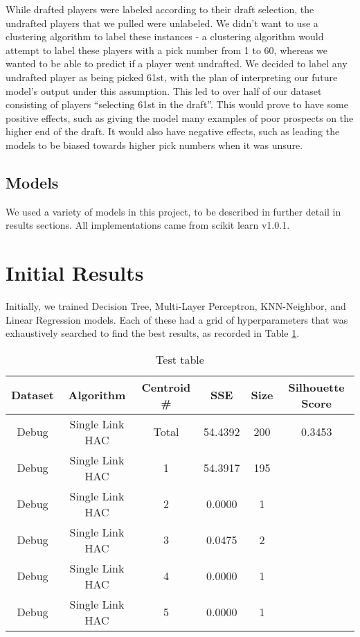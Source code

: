 \documentclass{article}
\begin{document}
While drafted players were labeled according to their draft selection, the
undrafted players that we pulled were unlabeled. We didn’t want to use a
clustering algorithm to label these instances - a clustering algorithm would
attempt to label these players with a pick number from 1 to 60, whereas we
wanted to be able to predict if a player went undrafted. We decided to label any
undrafted player as being picked 61st, with the plan of interpreting our future
model’s output under this assumption. This led to over half of our dataset
consisting of players “selecting 61st in the draft”. This would prove to have
some positive effects, such as giving the model many examples of poor prospects
on the higher end of the draft. It would also have negative effects, such as
leading the models to be biased towards higher pick numbers when it was unsure. 

\subsection{Models}

We used a variety of models in this project, to be described in further detail
in results sections. All implementations came from scikit learn v1.0.1.

\section{Initial Results}

Initially, we trained Decision Tree, Multi-Layer Perceptron, KNN-Neighbor, and
Linear Regression models. Each of these had a grid of hyperparameters that was
exhaustively searched to find the best results, as recorded in Table
\ref{tab:test_table}.

\begin{table}
	\begin{center}
		\begin{tabular}{||c c c c c c||} 
		\hline\hline
		Dataset & Algorithm & Centroid \# & SSE & Size & Silhouette Score \\ 
		\hline\hline
		Debug & Single Link HAC & Total & 54.4392 & 200 & 0.3453 \\ \hline
		Debug & Single Link HAC & 1 & 54.3917 & 195 & \\ \hline
		Debug & Single Link HAC & 2 & 0.0000 & 1 & \\ \hline
		Debug & Single Link HAC & 3 & 0.0475 & 2 & \\ \hline
		Debug & Single Link HAC & 4 & 0.0000 & 1 & \\ \hline
		Debug & Single Link HAC & 5 & 0.0000 & 1 & \\ \hline
		\hline\hline
		\end{tabular}
	\end{center}
	\caption{Test table}
	\label{tab:test_table}
\end{table}
\end{document}

